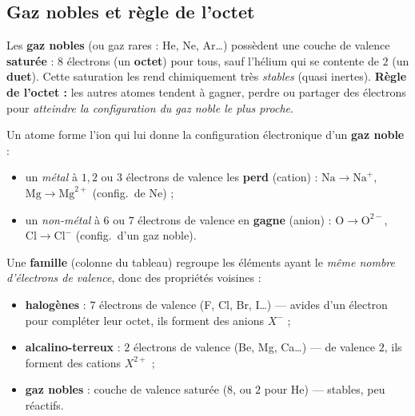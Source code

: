 \documentclass[11pt,a4paper]{article}
\begin{document}
\subsection{Gaz nobles et règle de l'octet}

\begin{definition}
Les \textbf{gaz nobles} (ou gaz rares : He, Ne, Ar\dots) possèdent une couche de valence
\textbf{saturée} : $8$ électrons (un \textbf{octet}) pour tous, sauf l'hélium qui se contente de $2$
(un \textbf{duet}). Cette saturation les rend chimiquement très \emph{stables} (quasi inertes).
\textbf{Règle de l'octet :} les autres atomes tendent à gagner, perdre ou partager des électrons pour
\emph{atteindre la configuration du gaz noble le plus proche}.
\end{definition}

\begin{theoreme}
Un atome forme l'ion qui lui donne la configuration électronique d'un \textbf{gaz noble} :
\begin{itemize}[leftmargin=1.6em,topsep=2pt,itemsep=1pt]
  \item un \emph{métal} à $1, 2$ ou $3$ électrons de valence les \textbf{perd} (cation) : $\mathrm{Na}
        \to \mathrm{Na}^{+}$, $\mathrm{Mg} \to \mathrm{Mg}^{2+}$ (config.\ de Ne) ;
  \item un \emph{non-métal} à $6$ ou $7$ électrons de valence en \textbf{gagne} (anion) : $\mathrm{O}
        \to \mathrm{O}^{2-}$, $\mathrm{Cl} \to \mathrm{Cl}^{-}$ (config.\ d'un gaz noble).
\end{itemize}
\end{theoreme}

\begin{definition}
Une \textbf{famille} (colonne du tableau) regroupe les éléments ayant le \emph{même nombre d'électrons
de valence}, donc des propriétés voisines :
\begin{itemize}[leftmargin=1.6em,topsep=2pt,itemsep=1pt]
  \item \textbf{halogènes} : $7$ électrons de valence (F, Cl, Br, I\dots) — avides d'un électron pour
        compléter leur octet, ils forment des anions $X^{-}$ ;
  \item \textbf{alcalino-terreux} : $2$ électrons de valence (Be, Mg, Ca\dots) — de valence $2$, ils
        forment des cations $X^{2+}$ ;
  \item \textbf{gaz nobles} : couche de valence saturée ($8$, ou $2$ pour He) — stables, peu réactifs.
\end{itemize}
\end{definition}
\end{document}
